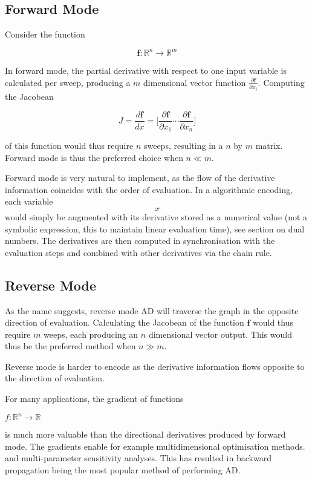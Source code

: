 \documentclass[11pt]{article}
\begin{document}
\subsection{Forward Mode}

Consider the function 

$$ \mathbf {f} : \mathbb{R}^n \rightarrow \mathbb{R}^m $$ 

In forward mode, the partial derivative with respect to one input variable is calculated per sweep, producing a $ m $ dimensional vector function $ \frac{\partial \mathbf {f}}{\partial x_i} $. Computing the Jacobean  

\[ J = \frac{d\mathbf {f}}{dx} = \Big[ \frac{\partial \mathbf {f}}{\partial x_1} \cdots \frac{\partial \mathbf {f}}{\partial x_n}   \Big] \]

of this function would thus require $ n $ sweeps, resulting in a $ n $ by $ m $ matrix. Forward mode is thus the preferred choice when $ n \ll m $. 

Forward mode is very natural to implement, as the flow of the derivative information coincides with the order of evaluation. In a algorithmic encoding, each variable $$ x $$ would simply be augmented with its derivative stored as a numerical value (not a symbolic expression, this to maintain linear evaluation time), see section on dual numbers. The derivatives are then computed in synchronisation with the evaluation steps and combined with other derivatives via the chain rule. 

\subsection{Reverse Mode}

As the name suggests, reverse mode AD will traverse the graph in the opposite direction of evaluation. Calculating the Jacobean of the function $ \mathbf{f} $ would thus require $ m $ weeps, each producing an $ n $ dimensional vector output. This would thus be the preferred method when $ n \gg m $. 

Reverse mode is harder to encode as the derivative information flows opposite to the direction of evaluation. 

For many applications, the gradient of functions 

$ f: \mathbb{R}^n \rightarrow \mathbb{R}$

is much more valuable than the directional derivatives produced by forward mode. The gradients enable for example multidimensional optimisation methods. and multi-parameter sensitivity analyses. This has resulted in backward propagation being the most popular method of performing AD. 
\end{document}
